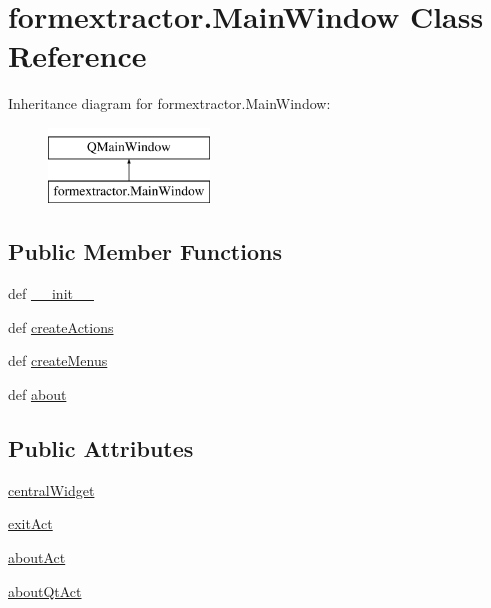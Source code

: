 \hypertarget{classformextractor_1_1MainWindow}{}\section{formextractor.\+Main\+Window Class Reference}
\label{classformextractor_1_1MainWindow}
Inheritance diagram for formextractor.\+Main\+Window\+:\begin{figure}[H]
\begin{center}
\leavevmode
\includegraphics[height=2.000000cm]{classformextractor_1_1MainWindow}
\end{center}
\end{figure}
\subsection*{Public Member Functions}
\begin{DoxyCompactItemize}
\item 
def \hyperlink{classformextractor_1_1MainWindow_ad95ffe4353bd1f52d3d2d5beb5592ce6}{\+\_\+\+\_\+init\+\_\+\+\_\+}
\item 
def \hyperlink{classformextractor_1_1MainWindow_a5c8daecf278548ac0050143f40163518}{create\+Actions}
\item 
def \hyperlink{classformextractor_1_1MainWindow_a4b8997212faaa6eb89161a4e8531a038}{create\+Menus}
\item 
def \hyperlink{classformextractor_1_1MainWindow_aedc574ebdd02e58665447a3480a50e6c}{about}
\end{DoxyCompactItemize}
\subsection*{Public Attributes}
\begin{DoxyCompactItemize}
\item 
\hyperlink{classformextractor_1_1MainWindow_aef4cb9507c0333ac49eadd54b5a8f08f}{central\+Widget}
\item 
\hyperlink{classformextractor_1_1MainWindow_aff381ba5a8383be5b16aee03ecae1dad}{exit\+Act}
\item 
\hyperlink{classformextractor_1_1MainWindow_a6fca8c0471abb4514ac42dd60b51d1a3}{about\+Act}
\item 
\hyperlink{classformextractor_1_1MainWindow_a70746c4ea3c1da44edbeb017c42313ab}{about\+Qt\+Act}
\end{DoxyCompactItemize}



